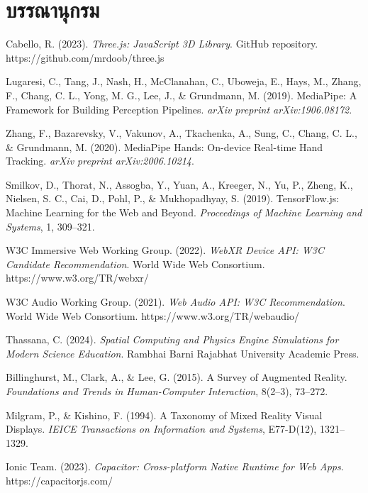 \chapter*{บรรณานุกรม}

\begin{enumerate}[leftmargin=1.5cm, label={[\arabic*]}, itemsep=8pt]
    \item Cabello, R. (2023). \textit{Three.js: JavaScript 3D Library}. GitHub repository. https://github.com/mrdoob/three.js
    \item Lugaresi, C., Tang, J., Nash, H., McClanahan, C., Uboweja, E., Hays, M., Zhang, F., Chang, C. L., Yong, M. G., Lee, J., \& Grundmann, M. (2019). MediaPipe: A Framework for Building Perception Pipelines. \textit{arXiv preprint arXiv:1906.08172}.
    \item Zhang, F., Bazarevsky, V., Vakunov, A., Tkachenka, A., Sung, C., Chang, C. L., \& Grundmann, M. (2020). MediaPipe Hands: On-device Real-time Hand Tracking. \textit{arXiv preprint arXiv:2006.10214}.
    \item Smilkov, D., Thorat, N., Assogba, Y., Yuan, A., Kreeger, N., Yu, P., Zheng, K., Nielsen, S. C., Cai, D., Pohl, P., \& Mukhopadhyay, S. (2019). TensorFlow.js: Machine Learning for the Web and Beyond. \textit{Proceedings of Machine Learning and Systems}, 1, 309--321.
    \item W3C Immersive Web Working Group. (2022). \textit{WebXR Device API: W3C Candidate Recommendation}. World Wide Web Consortium. https://www.w3.org/TR/webxr/
    \item W3C Audio Working Group. (2021). \textit{Web Audio API: W3C Recommendation}. World Wide Web Consortium. https://www.w3.org/TR/webaudio/
    \item Thassana, C. (2024). \textit{Spatial Computing and Physics Engine Simulations for Modern Science Education}. Rambhai Barni Rajabhat University Academic Press.
    \item Billinghurst, M., Clark, A., \& Lee, G. (2015). A Survey of Augmented Reality. \textit{Foundations and Trends in Human-Computer Interaction}, 8(2--3), 73--272.
    \item Milgram, P., \& Kishino, F. (1994). A Taxonomy of Mixed Reality Visual Displays. \textit{IEICE Transactions on Information and Systems}, E77-D(12), 1321--1329.
    \item Ionic Team. (2023). \textit{Capacitor: Cross-platform Native Runtime for Web Apps}. https://capacitorjs.com/
\end{enumerate}
